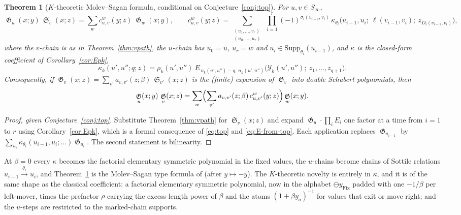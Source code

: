 \documentclass{amsart}
\newtheorem{theorem}{Theorem}[section]
\theoremstyle{definition}
\theoremstyle{remark}
\DeclareMathOperator{\sch}{\mathfrak{S}}
\DeclareMathOperator{\groth}{\mathfrak{G}}
\newcommand{\tom}[1]{\ensuremath{\xrightarrow{#1}}}
\newcommand{\fgn}{\ominus}
\newcommand{\Fix}{\mathrm{Fix}}
\newcommand{\Supp}{\mathrm{Supp}}
\begin{document}
\begin{theorem}[$K$-theoretic Molev--Sagan formula, conditional on Conjecture~\ref{conj:top}]\label{thm:ms}
For $u,v\in S_\infty$,
\[
\groth_u(x;y)\,\sch_v(x;z) = \sum_{w} c^{w}_{u,v}(y;z)\ \groth_w(x;y),
\qquad
c^{w}_{u,v}(y;z) = \sum_{\substack{(v_0,\dots,v_r)\\ (u_0,\dots,u_r)}}\ \prod_{i=1}^{r}
(-1)^{\sigma_i(v_{i-1},v_i)}\,
\kappa_{\theta_i}\bigl(u_{i-1},u_i;\ \ell(v_{i-1},v_i);\ z_{D_i(v_{i-1},v_i)}\bigr),
\]
where the $v$-chain is as in Theorem~\ref{thm:vpath}, the $u$-chain has $u_0=u$, $u_r=w$ and
$u_i\in\Supp_{\theta_i}(u_{i-1})$, and $\kappa$ is the closed-form coefficient of
Corollary~\ref{cor:Epk},
\[
\kappa_k(u',u'';q;z) = \rho_k(u',u'')\ E_{\,n_k(u',u'')-q,\ n_k(u',u'')}\bigl(\mathcal{Y}_k(u',u'');\ z_1,\dots,z_{q+1}\bigr).
\]
Consequently, if $\groth_v(x;z) = \sum_{v'} a_{v,v'}(z;\beta)\,\sch_{v'}(x;z)$ is the (finite)
expansion of $\groth_v$ into double Schubert polynomials, then
\[
\groth_u(x;y)\,\groth_v(x;z) = \sum_{w}\Bigl(\sum_{v'} a_{v,v'}(z;\beta)\,c^{w}_{u,v'}(y;z)\Bigr)\groth_w(x;y).
\]
\end{theorem}

\begin{proof}[Proof, given Conjecture~\ref{conj:top}]
Substitute Theorem~\ref{thm:vpath} for $\sch_v(x;z)$ and expand $\groth_u\cdot\prod_i E_i$
one factor at a time from $i=1$ to $r$ using Corollary~\ref{cor:Epk}, which is a formal
consequence of \eqref{eq:top} and \eqref{eq:E-from-top}. Each application replaces
$\groth_{u_{i-1}}$ by $\sum_{u_i}\kappa_{\theta_i}(u_{i-1},u_i;\ldots)\groth_{u_i}$. The second
statement is bilinearity.
\end{proof}

At $\beta=0$ every $\kappa$ becomes the factorial elementary symmetric polynomial in the fixed
values, the $u$-chains become chains of Sottile relations $u_{i-1}\tom{\theta_i}u_i$, and
Theorem~\ref{thm:ms} is the Molev--Sagan type formula of \cite{samuelmolev} (after
$y\mapsto-y$). The $K$-theoretic novelty is entirely in $\kappa$, and it is of the same shape
as the classical coefficient: a factorial elementary symmetric polynomial, now in the alphabet
$\fgn y_{\Fix}$ padded with one $-1/\beta$ per left-mover, times the prefactor $\rho$ carrying
the excess-length power of $\beta$ and the atoms $(1+\beta y_a)^{-1}$ for values that exit or
move right; and the $u$-steps are restricted to the marked-chain supports.
\end{document}
